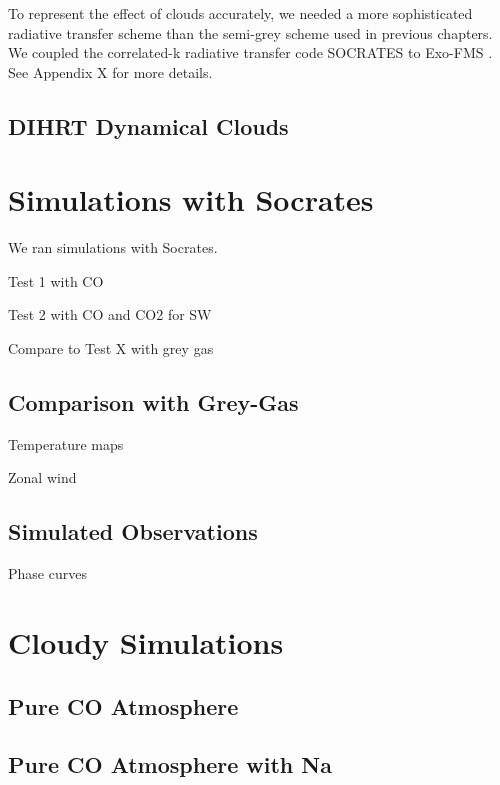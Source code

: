 To represent the effect of clouds accurately, we needed a more sophisticated radiative transfer scheme than the semi-grey scheme used in previous chapters. We coupled the correlated-k radiative transfer code SOCRATES to Exo-FMS \citep{Edwards1996socrates}. See Appendix X for more details.

\subsection{DIHRT Dynamical Clouds}


\section{Simulations with Socrates}

We ran simulations with Socrates.

Test 1 with CO

Test 2 with CO and CO2 for SW

Compare to Test X with grey gas


\subsection{Comparison with Grey-Gas}

Temperature maps

Zonal wind

\subsection{Simulated Observations}

Phase curves



\section{Cloudy Simulations}


\subsection{Pure CO Atmosphere}

\subsection{Pure CO Atmosphere with Na}

